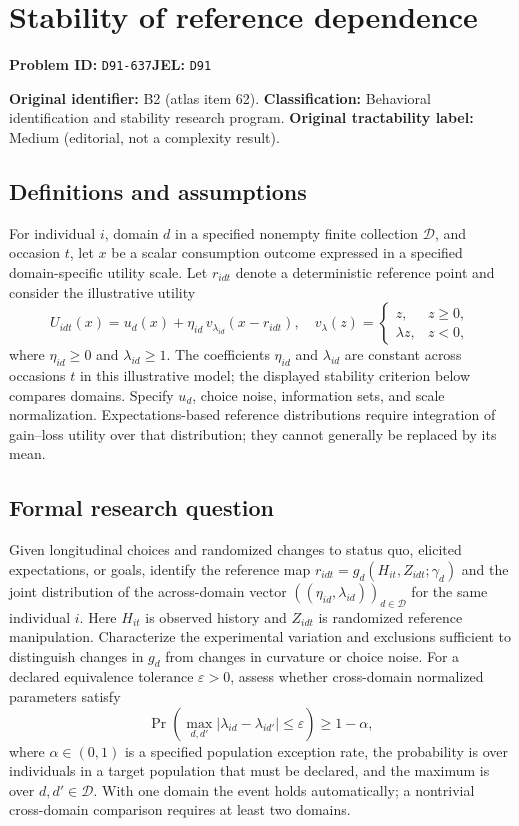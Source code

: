 \documentclass[11pt,a4paper]{article}
\begin{document}
\section*{Stability of reference dependence}
\textbf{Problem ID:} \texttt{D91-637}\quad \textbf{JEL:} \texttt{D91}\par
\label{problem:OP-0062}
\label{atlas:prob:B2}

\noindent\textbf{Original identifier:} B2 (atlas item 62). \textbf{Classification:} Behavioral identification and stability research program. \textbf{Original tractability label:} Medium (editorial, not a complexity result).

\subsection*{Definitions and assumptions}

For individual $i$, domain $d$ in a specified nonempty finite collection $\mathcal D$, and occasion $t$, let $x$ be a scalar consumption outcome expressed in a specified domain-specific utility scale. Let $r_{idt}$ denote a deterministic reference point and consider the illustrative utility
\[
U_{idt}(x)=u_d(x)+\eta_{id}\,v_{\lambda_{id}}(x-r_{idt}),\quad
v_\lambda(z)=\begin{cases}z,&z\geq0,\\ \lambda z,&z<0,\end{cases}
\]
where $\eta_{id}\geq0$ and $\lambda_{id}\geq1$. The coefficients $\eta_{id}$ and $\lambda_{id}$ are constant across occasions $t$ in this illustrative model; the displayed stability criterion below compares domains. Specify $u_d$, choice noise, information sets, and scale normalization. Expectations-based reference distributions require integration of gain--loss utility over that distribution; they cannot generally be replaced by its mean.

\subsection*{Formal research question}

Given longitudinal choices and randomized changes to status quo, elicited expectations, or goals, identify the reference map $r_{idt}=g_d(H_{it},Z_{idt};\gamma_d)$ and the joint distribution of the across-domain vector $((\eta_{id},\lambda_{id}))_{d\in\mathcal D}$ for the same individual $i$. Here $H_{it}$ is observed history and $Z_{idt}$ is randomized reference manipulation. Characterize the experimental variation and exclusions sufficient to distinguish changes in $g_d$ from changes in curvature or choice noise. For a declared equivalence tolerance $\varepsilon>0$, assess whether cross-domain normalized parameters satisfy
\[
\Pr\!\left(\max_{d,d'}|\lambda_{id}-\lambda_{id'}|\leq\varepsilon\right)\geq1-\alpha,
\]
where $\alpha\in(0,1)$ is a specified population exception rate, the probability is over individuals in a target population that must be declared, and the maximum is over $d,d'\in\mathcal D$. With one domain the event holds automatically; a nontrivial cross-domain comparison requires at least two domains.
\end{document}

